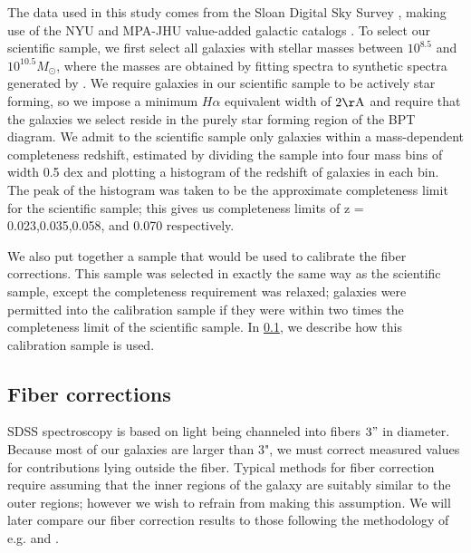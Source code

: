 \documentclass[iop]{emulateapj}
\begin{document}
The data used in this study comes from the Sloan Digital Sky Survey \citep[SDSS,][]{SDSS}, making use of the NYU and MPA-JHU value-added galactic catalogs \citep{Kauffmann03,Brinchmann04,blanton05vagc}. To select our scientific sample, we first select all galaxies with stellar masses between $10^{8.5}$ and $10^{10.5} M_{\odot}$, where the masses are obtained by fitting spectra to synthetic spectra generated by \cite{BC03}. We require galaxies in our scientific sample to be actively star forming, so we impose a minimum $H\alpha$ equivalent width of $2 \rm \AA$ and require that the galaxies we select reside in the purely star forming region of the BPT diagram. We admit to the scientific sample only galaxies within a mass-dependent completeness redshift, estimated by dividing the sample into four mass bins of width 0.5 dex and plotting a histogram of the redshift of galaxies in each bin. The peak of the histogram was taken to be the approximate completeness limit for the scientific sample; this gives us completeness limits of z = 0.023,0.035,0.058, and 0.070 respectively.

We also put together a sample that would be used to calibrate the fiber corrections. This sample was selected in exactly the same way as the scientific sample, except the completeness requirement was relaxed; galaxies were permitted into the calibration sample if they were within two times the completeness limit of the scientific sample. In \ref{sec:fibercor}, we describe how this calibration sample is used.

\subsection{Fiber corrections}
\label{sec:fibercor}
SDSS spectroscopy is based on light being channeled into fibers $3"$ in diameter. Because most of our galaxies are larger than 3", we must correct measured values for contributions lying outside the fiber. Typical methods for fiber correction require assuming that the inner regions of the galaxy are suitably similar to the outer regions; however we wish to refrain from making this assumption. We will later compare our fiber correction results to those following the methodology of e.g. \cite{Brinchmann04} and \cite{Salim07}.
\end{document}
